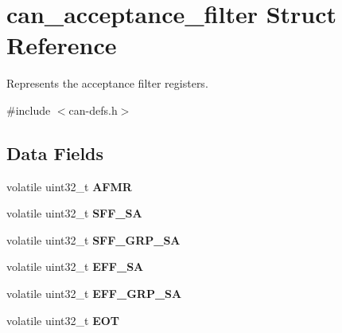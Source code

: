 \hypertarget{structcan__acceptance__filter}{}\section{can\+\_\+acceptance\+\_\+filter Struct Reference}
\label{structcan__acceptance__filter}


Represents the acceptance filter registers.  




{\ttfamily \#include $<$can-\/defs.\+h$>$}

\subsection*{Data Fields}
\begin{DoxyCompactItemize}
\item 
\mbox{\label{structcan__acceptance__filter_a9c93ccec0d0ad0080d82f7ede7bceccf}} 
volatile uint32\+\_\+t {\bfseries A\+F\+MR}
\item 
\mbox{\label{structcan__acceptance__filter_a7407d6e8cab7c568c794d85a80e48a7d}} 
volatile uint32\+\_\+t {\bfseries S\+F\+F\+\_\+\+SA}
\item 
\mbox{\label{structcan__acceptance__filter_a5a07ec28595ed94923a900d846a69b78}} 
volatile uint32\+\_\+t {\bfseries S\+F\+F\+\_\+\+G\+R\+P\+\_\+\+SA}
\item 
\mbox{\label{structcan__acceptance__filter_ad95e25ea58c864a0e0431817383da983}} 
volatile uint32\+\_\+t {\bfseries E\+F\+F\+\_\+\+SA}
\item 
\mbox{\label{structcan__acceptance__filter_aa6a83ae8675a2dd45181165d1bf03b53}} 
volatile uint32\+\_\+t {\bfseries E\+F\+F\+\_\+\+G\+R\+P\+\_\+\+SA}
\item 
\mbox{\label{structcan__acceptance__filter_a3f0dbeed514338f83ea496bf41e855a0}} 
volatile uint32\+\_\+t {\bfseries E\+OT}
\item 
\mbox{\label{structcan__acceptance__filter_a2f6895f66f97744c80fbbeaf246208fd}} 

\end{DoxyCompactItemize}
